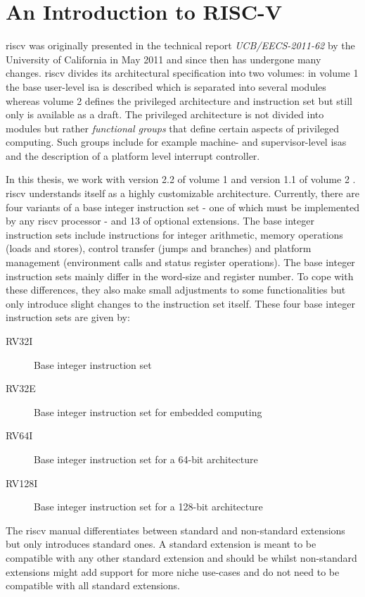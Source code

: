 \section{An Introduction to RISC-V}

\gls{riscv} was originally presented in the technical report \textit{UCB/EECS-2011-62} by the University of California in May 2011 \cite{RiscVISA-org} and since then has undergone many changes.
\gls{riscv} divides its architectural specification into two volumes: in volume 1 the base user-level \gls{isa} is described which is separated into several modules whereas volume 2 defines the privileged architecture and instruction set but still only is available as a draft.
The privileged architecture is not divided into modules but rather \textit{functional groups} that define certain aspects of privileged computing.
Such groups include for example machine- and supervisor-level \glspl{isa} and the description of a platform level interrupt controller.


In this thesis, we work with version 2.2 of volume 1 \cite{RiscVISA} and version 1.1 of volume 2 \cite{RiscVISAP}.
\gls{riscv} understands itself as a highly customizable architecture.
Currently, there are four variants of a base integer instruction set - one of which must be implemented by any \gls{riscv} processor - and 13 of optional extensions.
The base integer instruction sets include instructions for integer arithmetic, memory operations (loads and stores), control transfer (jumps and branches) and platform management (environment calls and status register operations).
The base integer instruction sets mainly differ in the word-size and register number.
To cope with these differences, they also make small adjustments to some functionalities but only introduce slight changes to the instruction set itself.
These four base integer instruction sets are given by:
\begin{description}
    \item[RV32I] Base integer instruction set
    \item[RV32E] Base integer instruction set for embedded computing
    \item[RV64I] Base integer instruction set for a 64-bit architecture
    \item[RV128I] Base integer instruction set for a 128-bit architecture
\end{description}

The \gls{riscv} manual differentiates between standard and non-standard extensions but only introduces standard ones.
A standard extension is meant to be compatible with any other standard extension and should be  whilst non-standard extensions might add support for more niche use-cases and do not need to be compatible with all standard extensions.

